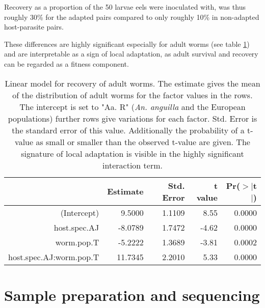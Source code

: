 Recovery as a proportion of the 50 larvae eels were inoculated with,
was thus roughly 30\% for the adapted pairs compared to only roughly
10\% in non-adapted host-parasite pairs.

These differences are highly significant especially for adult worms
(see table \ref{tab:ad-sig}) and are interpretable as a sign of local
adaptation, as adult survival and recovery can be regarded as a
fitness component.


\begin{table}[h]
\begin{center}
\begin{tabular}{rrrrr}
  \hline
 & Estimate & Std. Error & t value & Pr($>$$|$t$|$) \\ 
  \hline
  (Intercept) & 9.5000 & 1.1109 & 8.55 & 0.0000 \\ 
  host.spec.AJ & -8.0789 & 1.7472 & -4.62 & 0.0000 \\ 
  worm.pop.T & -5.2222 & 1.3689 & -3.81 & 0.0002 \\ 
  host.spec.AJ:worm.pop.T & 11.7345 & 2.2010 & 5.33 & 0.0000 \\ 
   \hline
\end{tabular}
\caption[Linear model for recovery]{Linear model for recovery of adult
  worms. The estimate gives the mean of the distribution of adult
  worms for the factor values in the rows. The intercept is set to
  "Aa. R" (\textit{An. anguilla} and the European populations) further
  rows give variations for each factor. Std. Error is the standard
  error of this value. Additionally the probability of a t-value as
  small or smaller than the observed t-value are given. The signature
  of local adaptation is visible in the highly significant interaction
  term.}
\label{tab:ad-sig}
\end{center}
\end{table}

\afterpage{\clearpage}




\section{Sample preparation and sequencing }

